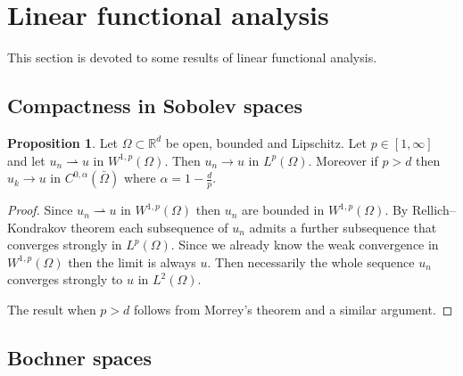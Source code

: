 \documentclass[a4paper,10pt,twoside]{amsbook}
\numberwithin{section}{chapter}
\numberwithin{equation}{chapter}
\theoremstyle{definition}
\newtheorem{prop}{Proposition}[chapter]
\begin{document}
\section{Linear functional analysis}

This section is devoted to some results of linear functional analysis.

\subsection{Compactness in Sobolev spaces}

\begin{prop}
\label{prop:sobolev-weak-lp-strong}
Let $\Omega\subset\mathbb{R}^d$ be open, bounded and Lipschitz. Let $p\in[1,\infty]$ and let $u_n\rightharpoonup u$ in $W^{1,p}(\Omega)$. Then $u_n\to u$ in $L^p(\Omega)$. Moreover if $p>d$ then $u_k\to u$ in $C^{0,\alpha}(\bar{\Omega})$ where $\alpha=1-\frac{d}{p}$.
\end{prop}
\begin{proof}
Since $u_n\rightharpoonup u$ in $W^{1,p}(\Omega)$ then $u_n$ are bounded in $W^{1,p}(\Omega)$. By Rellich--Kondrakov theorem each subsequence of $u_n$ admits a further subsequence that converges strongly in $L^p(\Omega)$. Since we already know the weak convergence in $W^{1,p}(\Omega)$ then the limit is always $u$. Then necessarily the whole sequence $u_n$ converges strongly to $u$ in $L^2(\Omega)$.

The result when $p>d$ follows from Morrey's theorem and a similar argument.
\end{proof}

\subsection{Bochner spaces}
\end{document}

